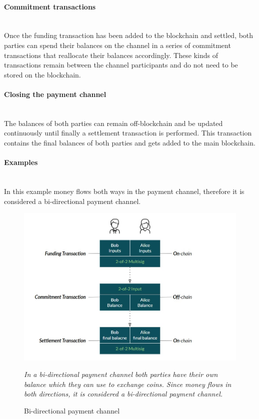 \documentclass[a4paper, 12pt]{report}
\begin{document}
\paragraph{Commitment transactions} \hspace{0pt} \\
Once the funding transaction has been added to the blockchain and settled, both parties can spend their balances on the channel in a series of commitment transactions that reallocate their balances accordingly. These kinds of transactions remain between the channel participants and do not need to be stored on the blockchain.

\paragraph{Closing the payment channel} \hspace{0pt} \\
The balances of both parties can remain off-blockchain and be updated continuously until finally a settlement transaction is performed. This transaction contains the final balances of both parties and gets added to the main blockchain.

\paragraph{Examples} \hspace{0pt} \\
In this example money flows both ways in the payment channel, therefore it is considered a bi-directional payment channel.\cite{andreas}

\begin{figure}[H]
	\centering
	\includegraphics[width=13cm]{06_Bidirectional_Channel}
	\caption{Bi-directional payment channel}
	\medskip
	\small \textit{In a bi-directional payment channel both parties have their own balance which they can use to exchange coins. Since money flows in both directions, it is considered a bi-directional payment channel.}
	\label{fig:06_Bidirectional_Channel}
\end{figure}
\end{document}
